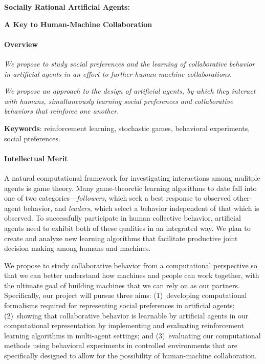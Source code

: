 
\centerline{\Large \bf Socially Rational Artificial Agents:}

\vspace{\down}
\centerline{\large \bf A Key to Human-Machine Collaboration}

\vspace{\up}
\paragraph{Overview}

\emph{We propose to study social preferences and the learning of collaborative behavior in artificial agents in an effort to further human-machine collaborations.}

\emph{We propose an approach to the design of artificial agents,
by which they interact with humans, simultaneously learning social
preferences and collaborative behaviors that reinforce one another.}

{\bf Keywords}: reinforcement learning, stochastic games, behavioral experiments, social preferences.

\vspace{\up}
\paragraph{Intellectual Merit}

A natural computational framework for investigating interactions among
mulitple agents is game theory. Many game-theoretic learning
algorithms to date fall into one of two categories---\emph{followers},
which seek a best response to observed other-agent behavior,
and \emph{leaders}, which select a behavior independent of that which
is observed. To successfully participate in human collective behavior,
artificial agents need to exhibit both of these qualities in an
integrated way. We plan to create and analyze new learning algorithms
that facilitate productive joint decision making among humans and
machines.


We propose to study collaborative behavior from a computational perspective so
that we can better understand how machines and people can work
together, with the ultimate goal of building machines that we can rely
on as our partners. Specifically, our project will pursue three aims:
%
(1)~developing computational formalisms required for representing
social preferences in artificial agents; (2)~showing that
collaborative behavior is learnable by artificial agents in our
computational representation by implementing and evaluating
reinforcement learning algorithms in multi-agent settings; and
(3)~evaluating our computational methods using behavioral experiments
in controlled environments that are specifically designed to allow for
the possibility of human-machine collaboration.

